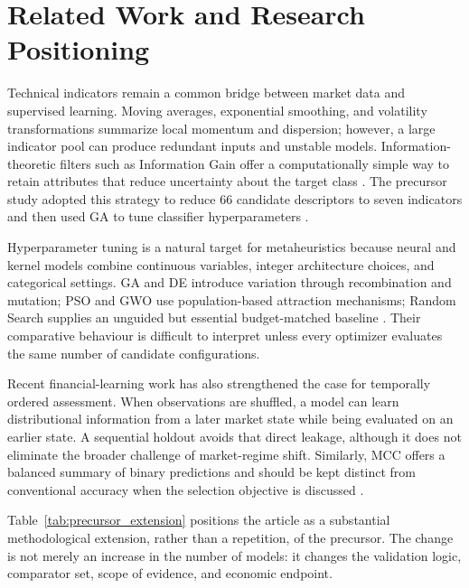 \section{Related Work and Research Positioning}\label{sec:related_work}

Technical indicators remain a common bridge between market data and supervised learning. Moving averages, exponential smoothing, and volatility transformations summarize local momentum and dispersion; however, a large indicator pool can produce redundant inputs and unstable models. Information-theoretic filters such as Information Gain offer a computationally simple way to retain attributes that reduce uncertainty about the target class \cite{lei2012feature,kumar2014feature}. The precursor study adopted this strategy to reduce 66 candidate descriptors to seven indicators and then used GA to tune classifier hyperparameters \cite{souza2026ijcnn}.

Hyperparameter tuning is a natural target for metaheuristics because neural and kernel models combine continuous variables, integer architecture choices, and categorical settings. GA and DE introduce variation through recombination and mutation; PSO and GWO use population-based attraction mechanisms; Random Search supplies an unguided but essential budget-matched baseline \cite{goldberg1989ga,kennedy1995pso,storn1997de,faris2018gwo_review,bergstra2012random_search}. Their comparative behaviour is difficult to interpret unless every optimizer evaluates the same number of candidate configurations.

Recent financial-learning work has also strengthened the case for temporally ordered assessment. When observations are shuffled, a model can learn distributional information from a later market state while being evaluated on an earlier state. A sequential holdout avoids that direct leakage, although it does not eliminate the broader challenge of market-regime shift. Similarly, MCC offers a balanced summary of binary predictions and should be kept distinct from conventional accuracy when the selection objective is discussed \cite{chicco2020mcc}.

Table~\ref{tab:precursor_extension} positions the article as a substantial methodological extension, rather than a repetition, of the precursor. The change is not merely an increase in the number of models: it changes the validation logic, comparator set, scope of evidence, and economic endpoint.

